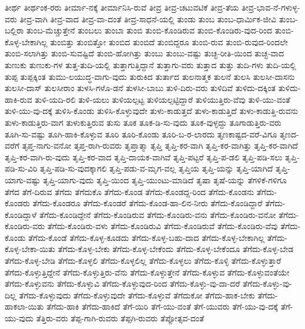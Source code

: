{ತೀರ್ಥ
ತೀರ್ಥಂಕ-ರರು
ತೀರ್ಮಾ-ನಕ್ಕೆ
ತೀರ್ಮಾನಿಸಿ-ರುವೆ
ತೀವ್ರ
ತೀವ್ರ-ಚಟುವಟಿಕೆ
ತೀವ್ರ-ತೆಯ
ತೀವ್ರ-ಭಾವ-ನೆ-ಗಳುಳ್ಳ-ವರು
ತೀವ್ರ-ವಾಗಿ
ತೀವ್ರ-ವಾದ
ತೀವ್ರ-ವಾ-ದಂತೆ
ತೀವ್ರ-ಸಾಧನೆ-ಯಲ್ಲಿ
ತುಂಡು
ತುಂಬ
ತುಂಬ-ಧಾರ್ಮಿಕ-ಜೀವಿ
ತುಂಬ-ಬಲ್ಲಿರಾ
ತುಂಬ-ಮೆಚ್ಚುತ್ತೇನೆ
ತುಂಬಲು
ತುಂಬಾ
ತುಂಬಿ
ತುಂಬಿ-ಕೊಂಡಿರುವ
ತುಂಬಿ-ಕೊಂಡಿರು-ವುದ-ರಿಂದ
ತುಂಬಿ-ಕೊಳ್ಳ-ಬೇಕಾಗಿಲ್ಲ
ತುಂಬಿತ್ತು
ತುಂಬಿತ್ತೋ
ತುಂಬಿದ
ತುಂಬಿದೆ
ತುಂಬಿದ್ದರೂ
ತುಂಬಿ-ರುವ
ತುಂಬಿ-ರುವುದ-ರಿಂದಲೇ
ತುಂಬಿ-ಸಲಾಗಿತ್ತು
ತುಂಬಿ-ಸುವಷ್ಟಿದೆ
ತುಂಬಿ-ಹೋಗಿತ್ತು
ತುಂಬು
ತುಂಬು-ವಷ್ಟು
ತುಚ್ಛ-ರೀತಿ-ಯಿಂದ
ತುಚ್ಛ-ವಾದ
ತುಣುಕು
ತುಣುಕು-ಗಳ
ತುತ್ತ-ತುದಿ-ಯಲ್ಲಿ
ತುತ್ತಾಗುತ್ತಿದ್ದಾನೆ
ತುತ್ತಾಗು-ವರು
ತುತ್ತಾದ
ತುತ್ತು
ತುದಿ-ಗಳು
ತುದಿ-ಯಲ್ಲಿ
ತುಪ್ಪ
ತುಪ್ಪಕ್ಕಿಂತ
ತುಮು-ಲಯುದ್ಧ-ವಾಗು-ವುದು
ತುರುಕಿದ
ತುರ್ತಾದ
ತುಲನಾತ್ಮಕ
ತುಲನೆ
ತುಲಸಿ
ತುಲಸೀ-ದಾಸನು
ತುಲಸೀ-ದಾಸ್
ತುಲಸೀರಾಂ
ತುಳಸಿ-ಗಳೊ-ಡನೆ
ತುಳಸೀ-ಬಾಬು
ತುಳಿ-ದಿರು-ವರು
ತುಳಿದಿವೆ
ತುಳಿದು-ದಕ್ಕಿಂತ
ತುಳಿದು-ಹಾಕಿ-ರುವ
ತುಳಿ-ಯದಿ-ರಲಿ
ತುಳಿ-ಯಲು
ತುಳಿಯಲ್ಪಟ್ಟ
ತುಳಿಯಲ್ಪಟ್ಟಿದ್ದಾರೆ
ತುಳಿಯುತ್ತಿರು-ವೆವು
ತುಳಿ-ಯು-ವಂತೆ
ತುಳಿ-ಯು-ವು-ದಕ್ಕೆ
ತುಳಿಸಿ-ಕೊಂಡು
ತುಳಿಸಿ-ಕೊಳ್ಳುವುದೇ
ತುಳು-ಕಾಡುತ್ತದೆ
ತುಳು-ಕಾಡುತ್ತಿದೆ
ತುಳು-ಕಾಡುತ್ತಿ-ರುವನು
ತುಳು-ಕಾಡುತ್ತಿರು-ವಾಗ
ತುಳುಕುತ್ತಿರುವ
ತುಸು
ತೂಕ
ತೂಕ-ಡಿ-ಸು-ವುದು
ತೂಕ-ವುಳ್ಳದ್ದು
ತೂಗಾಡುತ್ತಿರು-ವರು
ತೂಗಿ-ಸು-ವಷ್ಟು
ತೂಗಿ-ಹಾಕಿ-ಕೊಳ್ಳುವ
ತೂರಿ
ತೂರಿ-ಕೊಂಡು
ತೂರಿ-ಬ-ರ-ಲಾರದು
ತೃಣಕಾಷ್ಟದ-ವರೆ-ವಿಗೂ
ತೃಣದ-ವರೆಗೆ
ತೃಪ್ತ-ನಾಗು-ವನೋ
ತೃಪ್ತ-ರಾಗಿ-ರುವರು
ತೃಪ್ತಾತ್ಮಾ
ತೃಪ್ತಿ
ತೃಪ್ತಿ-ಕರ-ವಾಗಿ
ತೃಪ್ತಿ-ಕರ-ವಾಗಿತ್ತು
ತೃಪ್ತಿ-ಕರ-ವಾಗಿದೆ
ತೃಪ್ತಿ-ಕರ-ವಾಗಿ-ರು-ವುದು
ತೃಪ್ತಿ-ಕರ-ವಾದ
ತೃಪ್ತಿ-ದಾಯಕ-ವಾಗಿವೆ
ತೃಪ್ತಿ-ಪಟ್ಟರೆ
ತೃಪ್ತಿ-ಪ-ಡಲಿ
ತೃಪ್ತಿ-ಪಡಿ-ಸಲು
ತೃಪ್ತಿ-ಪಡಿ-ಸು-ವಿರಿ
ತೃಪ್ತಿ-ಪಡಿ-ಸು-ವುದಕ್ಕಾಗಲಿ
ತೃಪ್ತಿ-ಪಡು-ವ-ಮೃಗ-ವಲ್ಲ
ತೃಪ್ತಿಯ
ತೃಪ್ತಿ-ಯನ್ನು
ತೃಪ್ತಿ-ಯಾಗಿದೆ
ತೃಪ್ತಿ-ಯಾಗು-ವಷ್ಟು
ತೃಪ್ತಿ-ಯಾಗು-ವುದು
ತೃಪ್ತಿ-ಯಿಂದ
ತೃಪ್ತಿ-ಯುಂಟು-ಮಾಡಿದೆ
ತೃಷಾ
ತೃಷೆ-ಯನ್ನು
ತೆಗಳಿಕೆ-ಗಳಿಗೂ
ತೆಗೆದ
ತೆಗೆ-ದಿರುವ
ತೆಗೆದು
ತೆಗೆದುಕೊ
ತೆಗೆದು-ಕೊಂಡ
ತೆಗೆದು-ಕೊಂಡದ್ದ-ರಿಂದ
ತೆಗೆದು-ಕೊಂಡನು
ತೆಗೆದು-ಕೊಂಡರು
ತೆಗೆದು-ಕೊಂಡರೂ
ತೆಗೆದು-ಕೊಂಡರೆ
ತೆಗೆದು-ಕೊಂಡ-ಹಾ-ಲಿನ-ನೀರು
ತೆಗೆದು-ಕೊಂಡಿದ್ದಾರೆ
ತೆಗೆದು-ಕೊಂಡಿದ್ದಾಳೆ
ತೆಗೆದು-ಕೊಂಡಿದ್ದೇನೆ
ತೆಗೆದು-ಕೊಂಡಿರುವ
ತೆಗೆದು-ಕೊಂಡಿರು-ವನು
ತೆಗೆದು-ಕೊಂಡಿರು-ವನೋ
ತೆಗೆದು-ಕೊಂಡಿರು-ವರು
ತೆಗೆದು-ಕೊಂಡಿರು-ವಳು
ತೆಗೆದು-ಕೊಂಡಿರುವಿ
ತೆಗೆದು-ಕೊಂಡಿರುವೆ
ತೆಗೆದು-ಕೊಂಡಿರು-ವೆವು
ತೆಗೆದು-ಕೊಂಡು
ತೆಗೆದು-ಕೊಂಡೆ
ತೆಗೆದು-ಕೊಳ್ಳ-ಕೂಡದು
ತೆಗೆದು-ಕೊಳ್ಳ-ಬಹು-ದಾದ
ತೆಗೆದು-ಕೊಳ್ಳ-ಬೇಕಾಗಿಲ್ಲ
ತೆಗೆದು-ಕೊಳ್ಳ-ಬೇಕಾ-ಯಿತು
ತೆಗೆದು-ಕೊಳ್ಳ-ಬೇಕು
ತೆಗೆದು-ಕೊಳ್ಳ-ಬೇಕೆಂದು
ತೆಗೆದು-ಕೊಳ್ಳ-ಬೇಕೆಂದೂ
ತೆಗೆದು-ಕೊಳ್ಳ-ಬೇಡ
ತೆಗೆದು-ಕೊಳ್ಳ-ಬೇಡಿ
ತೆಗೆದು-ಕೊಳ್ಳಲಿ
ತೆಗೆದು-ಕೊಳ್ಳಲಿಲ್ಲ
ತೆಗೆದು-ಕೊಳ್ಳಲು
ತೆಗೆದು-ಕೊಳ್ಳಿ
ತೆಗೆದು-ಕೊಳ್ಳುತ್ತಾರೆ
ತೆಗೆದು-ಕೊಳ್ಳುತ್ತಿದ್ದೇನೆ
ತೆಗೆದು-ಕೊಳ್ಳುತ್ತಿರು-ವೆನು
ತೆಗೆದು-ಕೊಳ್ಳುತ್ತೇನೆ
ತೆಗೆದು-ಕೊಳ್ಳುವ
ತೆಗೆದು-ಕೊಳ್ಳುವಂತೆಯೇ
ತೆಗೆದು-ಕೊಳ್ಳುವನು
ತೆಗೆದು-ಕೊಳ್ಳುವಿ
ತೆಗೆದು-ಕೊಳ್ಳುವುದ-ರಿಂದ
ತೆಗೆದು-ಕೊಳ್ಳು-ವು-ದಾ-ದರೆ
ತೆಗೆದು-ಕೊಳ್ಳು-ವು-ದಿಲ್ಲ
ತೆಗೆದು-ಕೊಳ್ಳುವುದು
ತೆಗೆದು-ಕೊಳ್ಳುವುದೇ
ತೆಗೆದು-ಕೊಳ್ಳುವೆ
ತೆಗೆದುಕೋ
ತೆಗೆದು-ಹಾಕ-ಬೇಕು
ತೆಗೆದು-ಹಾಕಲಾ-ಯಿತು
ತೆಗೆದು-ಹಾಕಿ
ತೆಗೆದು-ಹಾಕಿದೆ
ತೆಗೆ-ಯಿರಿ
ತೆಗೆ-ಯು-ವಂತೆ
ತೆಗೆ-ಯುವರು
ತೆಗೆ-ಯು-ವು-ದಕ್ಕೆ
ತೆಗೆ-ಯು-ವುದು
ತೆತ್ತಿರು-ವರು
ತೆಪ್ಪ-ಗಾಗಿ-ರುವರು
ತೆಪ್ಪಗಿ-ರುವರು
ತೆಪ್ಪೋತ್ಸವ-ದಂತೆ
}
